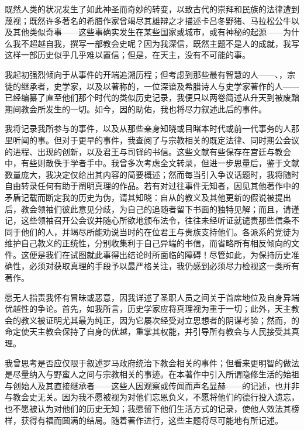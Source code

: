 既然人类的状况发生了如此神圣而奇妙的转变，以致古代的崇拜和民族的法律遭到蔑视；既然许多著名的希腊作家曾竭尽其雄辩之才描述卡吕冬野猪、马拉松公牛以及其他类似奇事——这些事确实发生在某些国家或城市，或有神秘的起源——为什么我不超越自我，撰写一部教会史呢？因为我深信，既然主题不是人的成就，我写这样一部历史似乎几乎难以置信；但是，在天主，没有不可能的事。\par

我起初强烈倾向于从事件的开端追溯历程；但考虑到那些最有智慧的人——、，宗徒的继承者，史学家，以及以著称的，一位深谙及希腊诗人与史学家著作的人——已经编纂了直至他们那个时代的类似历史记录，我便只以两卷简述从升天到被废黜期间教会所发生的一切。如今，因的助佑，我也将尽力叙述此后的事件。\par

我将记录我所参与的事件，以及从那些亲身知晓或目睹本时代或前一代事务的人那里听闻的事。但对于更早的事件，我查阅了与宗教相关的既定法律、同时期公会议的进程、出现的创新，以及君王与司铎的书信。这些文献有些保存在宫廷与教会中，有些则散佚于学者手中。我曾多次考虑全文转录，但进一步思量后，鉴于文献数量庞大，我决定仅给出其内容的简要概述；然而每当引入争议话题时，我将随时自由转录任何有助于阐明真理的作品。若有对过往事件无知者，因见其他著作中的矛盾记载而断定我的历史为伪，请其知晓：自从的教义及其他更新的假说被提出后，教会领袖们彼此意见分歧，为自己的追随者留下书面的独特见解；而且，请谨记，这些领袖召开公会议并随心所欲地颁布法令，往往未经听证就谴责那些信条不同于他们的人，并竭尽所能劝说当时的在位君王与贵族支持他们。各派系的党徒为维护自己教义的正统性，分别收集利于自己异端的书信，而省略所有相反倾向的文件。这便是我们在试图就此事得出结论时所面临的障碍！尽管如此，为保持历史准确性，必须对获取真理的手段予以最严格关注，我仍感到必须尽力检视这一类所有著作。\par

愿无人指责我怀有冒昧或恶意，因我详述了圣职人员之间关于首席地位及自身异端优越性的争论。首先，如我所言，历史学家应将真理视为重于一切；此外，天主教会的教义被证明尤其最为纯正，因为它屡次经受对立思想者的阴谋考验；然而，的命定使天主教会保持了自身的优越，重掌其权能，并引导所有教会与人民接受其真理。\par

我曾思考是否应仅限于叙述罗马政府统治下教会相关的事件；但看来更明智的做法是尽量纳入与野蛮人之间与宗教相关的事迹。在本著作中引入所谓隐修生活的始祖与创始人及其直接继承者——这些人因观察或传闻而声名显赫——的记述，也并非与教会史无关。因为我不愿被视为对他们忘恩负义，不愿将他们的德行投入遗忘，也不愿被认为对他们的历史无知；我愿留下他们生活方式的记录，使他人效法其榜样，获得有福而圆满的结局。随着著作进行，这些主题将尽可能地有所记述。\par

